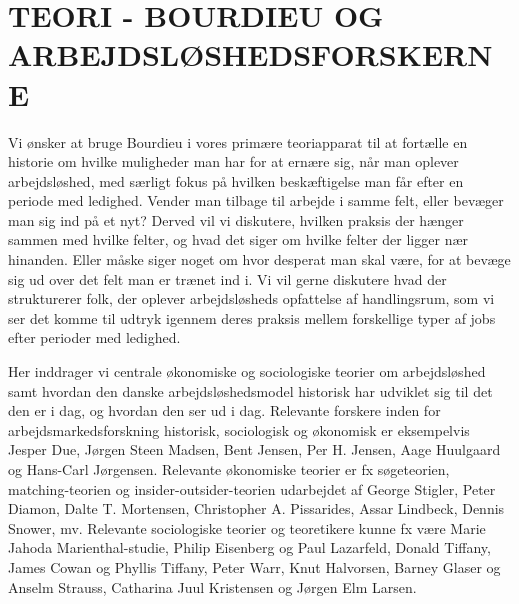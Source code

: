 

\chapter{TEORI - BOURDIEU OG ARBEJDSLØSHEDSFORSKERNE} \label{baggrund}






Vi ønsker at bruge Bourdieu i vores primære teoriapparat til at fortælle en historie om hvilke muligheder man har for at ernære sig, når man oplever arbejdsløshed, med særligt fokus på hvilken beskæftigelse man får efter en periode med ledighed. Vender man tilbage til arbejde i samme felt, eller bevæger man sig ind på et nyt? Derved vil vi diskutere, hvilken praksis der hænger sammen med hvilke felter, og hvad det siger om hvilke felter der ligger nær hinanden. Eller måske siger noget om hvor desperat man skal være, for at bevæge sig ud over det felt man er trænet ind i. Vi vil gerne diskutere hvad der strukturerer folk, der oplever arbejdsløsheds opfattelse af handlingsrum, som vi ser det komme til udtryk igennem deres praksis mellem forskellige typer af jobs efter perioder med ledighed.

Her inddrager vi centrale økonomiske og sociologiske teorier om arbejdsløshed samt hvordan den danske arbejdsløshedsmodel historisk har udviklet sig til det den er i dag, og hvordan den ser ud i dag. Relevante forskere inden for arbejdsmarkedsforskning historisk, sociologisk og økonomisk er eksempelvis Jesper Due, Jørgen Steen Madsen, Bent Jensen, Per H. Jensen, Aage Huulgaard og Hans-Carl Jørgensen. Relevante økonomiske teorier er fx søgeteorien, matching-teorien og insider-outsider-teorien udarbejdet af George Stigler, Peter Diamon, Dalte T. Mortensen, Christopher A. Pissarides, Assar Lindbeck, Dennis Snower, mv. Relevante sociologiske teorier og teoretikere kunne fx være Marie Jahoda  Marienthal-studie, Philip Eisenberg og Paul Lazarfeld, Donald Tiffany, James Cowan og Phyllis Tiffany, Peter Warr, Knut Halvorsen, Barney Glaser og Anselm Strauss, Catharina Juul Kristensen og Jørgen Elm Larsen.

